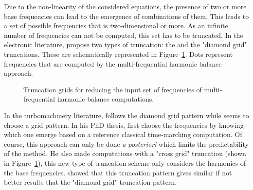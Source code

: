 Due to the non-linearity of the considered
equations, the presence 
of two or more base frequencies can lead to
the emergence of combinations of them.
This leads to a set of possible frequencies that 
is two-dimensional or more. As an infinite number of frequencies
can not be computed, this set 
has to be truncated. In the electronic literature,
\citet{Kundert1988} propose two types of truncation:
the  and the "diamond grid" truncations.
These are schematically represented in Figure~\ref{fig:dream_hb_truncation}.
Dots represent frequencies that are computed by the multi-frequential
harmonic balance approach.
\begin{figure}[htp]
  \centering
  \caption{Truncation grids for reducing the input set of frequencies of multi-frequential
  harmonic balance computations.}
  \label{fig:dream_hb_truncation}
\end{figure}
In the turbomachinery literature, \citet{Gopinath2007} follows the
diamond grid pattern while \citet{Ekici2007} seems to choose a
 grid pattern. In his PhD thesis, \citet{ThesisGuedeney}
first choose the frequencies by knowing which one emerge based on
a reference classical time-marching computation. Of course,
this approach can only be done \emph{a posteriori} which limits
the predictability of the method. He
also made computations with a "cross grid" truncation 
(shown in Figure~\ref{fig:dream_hb_truncation}), this new type 
of truncation scheme only considers the harmonics of the
base frequencies. \citet{ThesisGuedeney} showed that this
truncation pattern gives
similar if not better results that the
"diamond grid" truncation pattern. 





